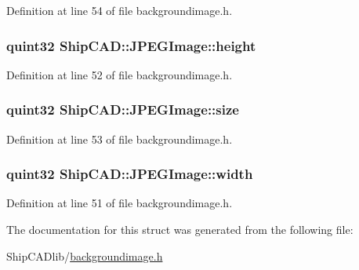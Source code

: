 Definition at line 54 of file backgroundimage.\-h.

\hypertarget{structShipCAD_1_1JPEGImage_a35650ffa91785a63ba6f31cd87e208a2}{
\subsubsection[{height}]{\setlength{\rightskip}{0pt plus 5cm}quint32 Ship\-C\-A\-D\-::\-J\-P\-E\-G\-Image\-::height}}\label{structShipCAD_1_1JPEGImage_a35650ffa91785a63ba6f31cd87e208a2}


Definition at line 52 of file backgroundimage.\-h.

\hypertarget{structShipCAD_1_1JPEGImage_a7e28010a6fb1d0c2926f8381b2e29931}{
\subsubsection[{size}]{\setlength{\rightskip}{0pt plus 5cm}quint32 Ship\-C\-A\-D\-::\-J\-P\-E\-G\-Image\-::size}}\label{structShipCAD_1_1JPEGImage_a7e28010a6fb1d0c2926f8381b2e29931}


Definition at line 53 of file backgroundimage.\-h.

\hypertarget{structShipCAD_1_1JPEGImage_aef2620e748540276be24c0275620870b}{
\subsubsection[{width}]{\setlength{\rightskip}{0pt plus 5cm}quint32 Ship\-C\-A\-D\-::\-J\-P\-E\-G\-Image\-::width}}\label{structShipCAD_1_1JPEGImage_aef2620e748540276be24c0275620870b}


Definition at line 51 of file backgroundimage.\-h.



The documentation for this struct was generated from the following file\-:\begin{DoxyCompactItemize}
\item 
Ship\-C\-A\-Dlib/\hyperlink{backgroundimage_8h}{backgroundimage.\-h}\end{DoxyCompactItemize}
